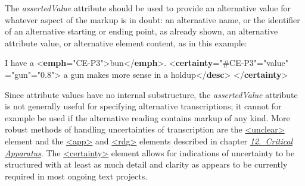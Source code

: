 The {\itshape assertedValue} attribute should be used to provide an alternative value for whatever aspect of the markup is in doubt: an alternative name, or the identifier of an alternative starting or ending point, as already shown, an alternative attribute value, or alternative element content, as in this example: \par\bgroup{}\exampleFont \begin{shaded}\noindent\mbox{}I have a {<\textbf{emph}\hspace*{1em}{xml:id}="{CE-P3}">}bun{</\textbf{emph}>}.\mbox{}\newline 
\mbox{}\newline 
{<\textbf{certainty}\hspace*{1em}{target}="{\#CE-P3}"\hspace*{1em}{locus}="{value}"\mbox{}\newline 
\hspace*{1em}{assertedValue}="{gun}"\hspace*{1em}{degree}="{0.8}">}\mbox{}\newline 
{}a gun makes more sense in a holdup{</\textbf{desc}>}\mbox{}\newline 
{</\textbf{certainty}>}\end{shaded}\egroup\par \noindent  Since attribute values have no internal substructure, the {\itshape assertedValue} attribute is not generally useful for specifying alternative transcriptions; it cannot for example be used if the alternative reading contains markup of any kind. More robust methods of handling uncertainties of transcription are the \hyperref[TEI.unclear]{<unclear>} element and the \hyperref[TEI.app]{<app>} and \hyperref[TEI.rdg]{<rdg>} elements described in chapter \textit{\hyperref[TC]{12.\ Critical Apparatus}}. The \hyperref[TEI.certainty]{<certainty>} element allows for indications of uncertainty to be structured with at least as much detail and clarity as appears to be currently required in most ongoing text projects.
